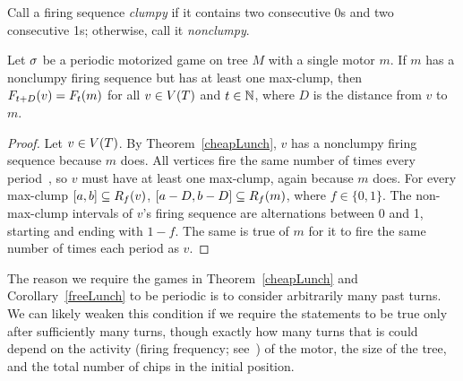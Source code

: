 Call a firing sequence \emph{clumpy} if it contains two consecutive 0s and two
consecutive 1s; otherwise, call it \emph{nonclumpy}.

\begin{cor} \label{freeLunch}
Let $\s$ be a periodic motorized game on tree $M$ with a single motor $m$. If
$m$ has a nonclumpy firing sequence but has at least one max-clump, then
$\firing{v}{t+D} = \firing{m}{t}$ for all $v \in \V[T]$ and $t \in \nats$,
where $D$ is the distance from $v$ to $m$.
\end{cor}

\begin{proof}
Let $v \in \V[T]$. By Theorem~\ref{cheapLunch}, $v$ has a nonclumpy firing
sequence because $m$ does. All vertices fire the same number of times every
period~\cite[Proposition~2.5]{jiang}, so $v$ must have at least one max-clump,
again because $m$ does. For every max-clump $[a, b] \subseteq \pat{v}{f}$,
$[a-D, b-D] \subseteq \pat{m}{f}$, where $f \in \{0,1\}$. The non-max-clump
intervals of $v$'s firing sequence are alternations between 0 and 1, starting
and ending with $1-f$. The same is true of $m$ for it to fire the same number
of times each period as $v$.
\end{proof}

The reason we require the games in Theorem~\ref{cheapLunch} and
Corollary~\ref{freeLunch} to be periodic is to consider arbitrarily many past
turns. We can likely weaken this condition if we require the statements to be
true only after sufficiently many turns, though exactly how many turns that is
could depend on the activity (firing frequency; see~\cite{levine}) of the
motor, the size of the tree, and the total number of chips in the initial
position.
